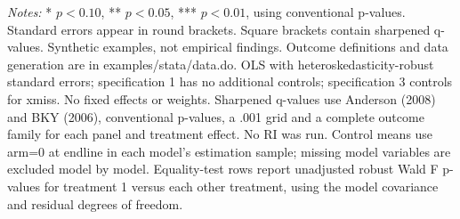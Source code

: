 \begin{table}[htbp]
\begin{threeparttable}
\begin{tabular}{@{}>{\raggedright\arraybackslash}p{}*{3}{>{\centering\arraybackslash}p{}}@{}}
\hline
\bottomrule
\end{tabular}
\begin{tablenotes}[flushleft]\footnotesize
\item \textit{Notes:} * $p<0.10$, ** $p<0.05$, *** $p<0.01$, using conventional p-values. Standard errors appear in round brackets. Square brackets contain sharpened q-values. Synthetic examples, not empirical findings. Outcome definitions and data generation are in examples/stata/data.do. OLS with heteroskedasticity-robust standard errors; specification 1 has no additional controls; specification 3 controls for xmiss. No fixed effects or weights. Sharpened q-values use Anderson (2008) and BKY (2006), conventional p-values, a .001 grid and a complete outcome family for each panel and treatment effect. No RI was run. Control means use arm=0 at endline in each model's estimation sample; missing model variables are excluded model by model. Equality-test rows report unadjusted robust Wald F p-values for treatment 1 versus each other treatment, using the model covariance and residual degrees of freedom.
\end{tablenotes}
\end{threeparttable}
\end{table}
\endgroup
